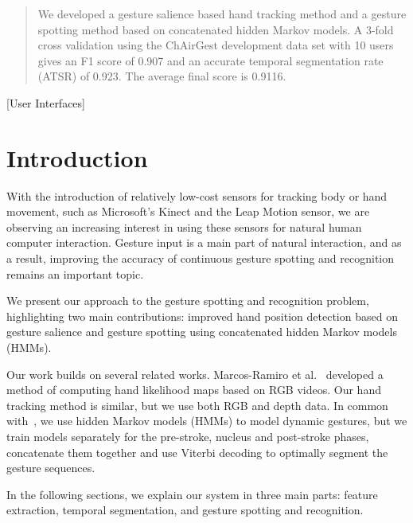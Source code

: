 \documentclass{sig-alternate-2013}
\begin{document}
\maketitle
\begin{abstract}
We developed a gesture salience based hand tracking method and a gesture spotting method based on
concatenated hidden Markov models.
A 3-fold cross validation using the ChAirGest development data set with 10 users gives an F1 score of 0.907
and an accurate temporal segmentation rate (ATSR) of 0.923. The average final score is 0.9116.
\end{abstract}

[User Interfaces]


\section{Introduction}
With the introduction of relatively low-cost sensors for tracking body or hand
movement, such as Microsoft's Kinect and the Leap Motion sensor, we are observing 
an increasing interest in using these sensors for natural human computer
interaction.
Gesture input is a main part of natural interaction, and as a result, improving the accuracy of
continuous gesture spotting and recognition remains an important topic.

We present our approach to the gesture spotting and recognition problem,
highlighting two main contributions:
improved hand position detection based on gesture salience and gesture spotting
using concatenated hidden Markov models (HMMs).

Our work builds on several related works. Marcos-Ramiro et al.~\cite{marcos2013} developed a method of computing hand likelihood maps based on RGB videos. 
Our hand tracking method is similar, but we use both RGB and depth data. 
In common with~\cite{Starner95, yin10}, we use hidden Markov models (HMMs) to model dynamic gestures,
but we train models separately for the pre-stroke, nucleus and post-stroke phases, concatenate them together and use Viterbi decoding to optimally segment the
gesture sequences. 

In the following sections, we explain our system in three main parts: feature extraction, temporal segmentation, and gesture
spotting and recognition.  
\end{document}
